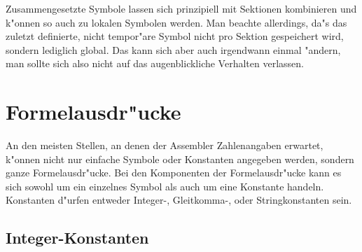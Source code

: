 \documentclass[12pt,a4paper,twoside]{report}
\begin{document}
Zusammengesetzte Symbole lassen sich prinzipiell mit Sektionen kombinieren
und k"onnen so auch zu lokalen Symbolen werden.  Man beachte allerdings,
da"s das zuletzt definierte, nicht tempor"are Symbol nicht pro Sektion
gespeichert wird, sondern lediglich global.  Das kann sich
aber auch irgendwann einmal "andern, man sollte sich also nicht auf das
augenblickliche Verhalten verlassen.


\section{Formelausdr"ucke}

An den meisten Stellen, an denen der Assembler Zahlenangaben erwartet,
k"onnen nicht nur einfache Symbole oder Konstanten angegeben werden,
sondern ganze Formelausdr"ucke.  Bei den Komponenten der Formelausdr"ucke
kann es sich sowohl um ein einzelnes Symbol als auch um eine Konstante
handeln.  Konstanten d"urfen entweder Integer-, Gleitkomma-, oder
Stringkonstanten sein.

\subsection{Integer-Konstanten}
\label{SectIntConsts}
\end{document}
